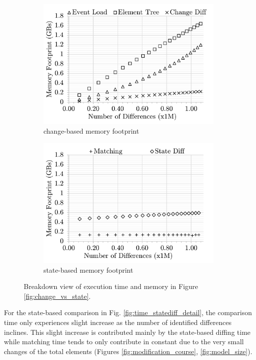 \documentclass{llncs}
\begin{document}
\begin{figure}[ht]
\begin{subfigure}[t]{0.495\linewidth}
    \includegraphics[width=\linewidth]{images/Memory-ChangeDiff-Detail}
    \caption{change-based memory footprint}
    \label{fig:memory_changediff_detail}
\end{subfigure}
\hfill
\begin{subfigure}[t]{0.495\linewidth}
    \includegraphics[width=\linewidth]{images/Memory-StateDiff-Detail}
    \caption{state-based memory footprint}
    \label{fig:memory_statediff_detail}
\end{subfigure}
    \caption{Breakdown view of execution time and memory in Figure \ref{fig:change_vs_state}.}
    \label{fig:time_memory_detail}
\end{figure}

For the state-based comparison in Fig. \ref{fig:time_statediff_detail}, the comparison time only experiences slight increase as the number of identified differences inclines. This slight increase is contributed mainly by the state-based diffing time while matching time tends to only contribute in constant due to the very small changes of the total elements (Figures \ref{fig:modification_course}, \ref{fig:model_size}).
\end{document}
